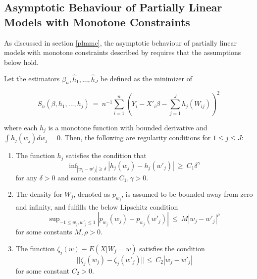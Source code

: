 \documentclass[10pt]{olplainarticle}\usepackage[]{graphicx}\usepackage[]{color}
\begin{document}




\begin{appendices}

\section{Asymptotic Behaviour of Partially Linear Models with Monotone Constraints} \label{abplmmc}

As discussed in section \ref{plmmc}, the asymptotic behaviour of partially linear models with monotone constraints described by \cite{guangcheng} requires that the assumptions below hold.

Let the estimators $\hat{\beta}_n, \hat{h}_1, ..., \hat{h}_J$ be defined as the minimizer of 

\begin{equation} \label{guangassum}
   S_n(\beta, h_1, ..., h_j) \ =\ n^{-1} \sum_{i=1}^{n}(Y_i - X'_i\beta - \sum_{j=1}^{J}h_j(W_{ij}))^2
\end{equation}

where each $h_j$ is a monotone function with bounded derivative and $\int h_j(w_j)dw_j = 0$. Then, the following are regularity conditions for $1 \leq j \leq J$:

\begin{enumerate}
  \item The function $h_j$ satisfies the condition that
  \begin{equation}
   \text{inf}_{|w_j - w'_j|\geq \delta} \ |h_j(w_j) - h_j(w'_j)| \ \geq \ C_1 \delta^{\gamma}
  \end{equation}
for any $\delta > 0$ and some constants $C_1, \gamma > 0$.

  \item The density for $W_j$, denoted as $p_{w_j}$, is assumed to be bounded away from zero and infinity, and fulfills the below Lipschitz condition
  \begin{equation}
   \text{sup}_{-1 \leq w_j, w'_j \leq 1} \ |p_{w_j}(w_j) - p_{w_j}(w'_j)| \ \leq \ M |w_j - w'_j|^{\rho}
  \end{equation}
for some constants $M, \rho > 0$.

  \item The function $\zeta_j(w) \equiv E(X|W_j = w)$ satisfies the condition
  \begin{equation}
   || \zeta_j(w_j) - \zeta_j(w'_j) || \leq \ C_2 |w_j - w'_j|
  \end{equation}
  for some constant $C_2 > 0$.
  

\end{enumerate}
\end{appendices}
\end{document}
